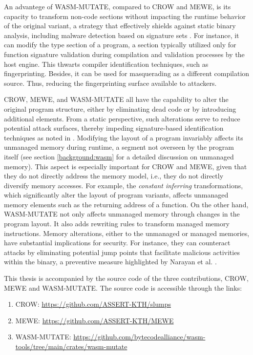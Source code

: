An advantege of WASM-MUTATE, compared to CROW and MEWE, is its capacity to transform non-code sections without impacting the runtime behavior of the original variant, a strategy that effectively shields against static binary analysis, including malware detection based on signature sets \cite{CABRERAARTEAGA2023103296}.
For instance, it can modify the type section of a \Wasm program, a section typically utilized only for function signature validation during compilation and validation processes by the host engine. 
This thwarts compiler identification techniques, such as fingerprinting.
Besides, it can be used for masquerading as a different compilation source.
Thus, reducing the fingerprinting surface available to attackers.


CROW, MEWE, and WASM-MUTATE all have the capability to alter the original program structure, either by eliminating dead code or by introducing additional elements. 
From a static perspective, such alterations serve to reduce potential attack surfaces, thereby impeding signature-based identification techniques as noted in \cite{CABRERAARTEAGA2023103296}.
Modifying the layout of a \Wasm program invariably affects its unmanaged memory during runtime, a segment not overseen by the \Wasm program itself (see section \autoref{background:wasm} for a detailed discussion on unmanaged memory). 
This aspect is especially important for CROW and MEWE, given that they do not directly address the \Wasm memory model, i.e., they do not directly diversify memory accesses. 
For example, the \emph{constant inferring} transformations, which significantly alter the layout of program variants, affects unmanaged memory elements such as the returning address of a function.
On the other hand, WASM-MUTATE not only affects unmanaged memory through changes in the \Wasm program layout.
It also adds rewriting rules to transform managed memory instructions. 
Memory alterations, either to the unmanaged or managed memories, have substantial implications for security. 
For instance, they can counteract attacks by eliminating potential jump points that facilitate malicious activities within the binary, a preventive measure highlighted by Narayan et al. \cite{Swivel}.


This thesis is accompanied by the source code of the three contributions, CROW, MEWE and WASM-MUTATE. 
The source code is accessible through the links:
\begin{enumerate}
    \item CROW: \url{https://github.com/ASSERT-KTH/slumps}
    \item MEWE: \url{https://github.com/ASSERT-KTH/MEWE}
    \item WASM-MUTATE: \url{https://github.com/bytecodealliance/wasm-tools/tree/main/crates/wasm-mutate}
\end{enumerate}

